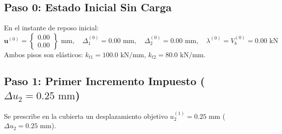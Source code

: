 \documentclass[11pt,letterpaper]{article}
\begin{document}
\subsection{Paso 0: Estado Inicial Sin Carga}
En el instante de reposo inicial:
\begin{equation}
    \mathbf{u}^{(0)} = \begin{Bmatrix} 0.00 \\ 0.00 \end{Bmatrix}\text{ mm}, \quad
    \Delta_1^{(0)} = 0.00\text{ mm}, \quad
    \Delta_2^{(0)} = 0.00\text{ mm}, \quad
    \lambda^{(0)} = V_b^{(0)} = 0.00\text{ kN}
\end{equation}
Ambos pisos son elásticos: $k_{t1} = 100.0\text{ kN/mm}$, $k_{t2} = 80.0\text{ kN/mm}$.

\subsection{Paso 1: Primer Incremento Impuesto (\texorpdfstring{$\Delta u_2 = 0.25\text{ mm}$}{Delta u2 = 0.25 mm})}

Se prescribe en la cubierta un desplazamiento objetivo $u_2^{(1)} = 0.25\text{ mm}$ ($\Delta u_2 = 0.25\text{ mm}$).
\end{document}
